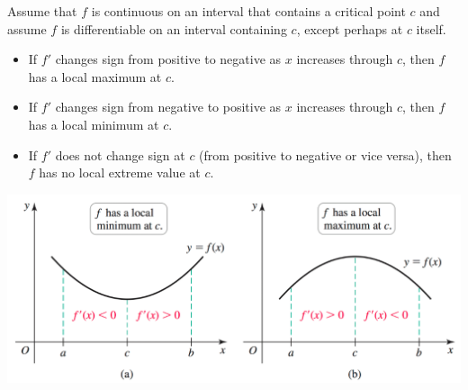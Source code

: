 \documentclass[mathNotesPreamble]{subfiles}
\begin{document}
\begin{thmBox*}
  Assume that $f$ is continuous on an interval that contains a critical point $c$ and assume $f$ is differentiable on an interval containing $c$, except perhaps at $c$ itself.

\vspace*{10pt}
  \begin{minipage}{0.85\linewidth}
    \begin{itemize}
      \item If $f'$ changes sign from positive to negative as $x$ increases through $c$, then $f$ has a local maximum at $c$.
      \item If $f'$ changes sign from negative to positive as $x$ increases through $c$, then $f$ has a local minimum at $c$.
      \item If $f'$ does not change sign at $c$ (from positive to negative or vice versa), then $f$ has no local extreme value at $c$.
    \end{itemize}
  \end{minipage}
\end{thmBox*}

\begin{center}
  \includegraphics[width=0.6\linewidth]{images/briggs_04_03/fig4_26.png}
\end{center}
\vspace*{-35pt}
\pagebreak
\end{document}
